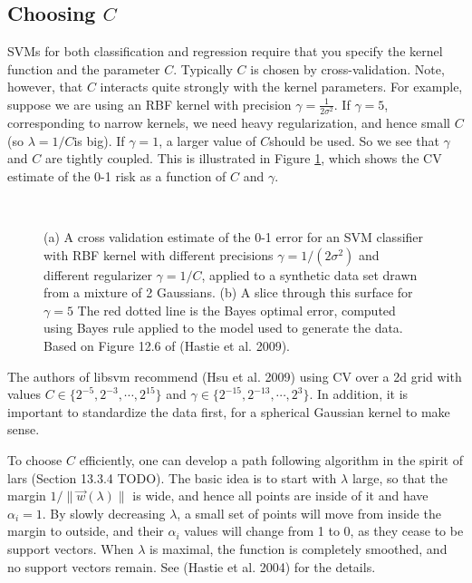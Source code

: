 \subsection{Choosing $C$}
\label{sec:SVM-Choosing-C}
SVMs for both classification and regression require that you specify the kernel function and the parameter $C$. Typically $C$ is chosen by cross-validation. Note, however, that $C$ interacts quite strongly with the kernel parameters. For example, suppose we are using an RBF kernel with precision $\gamma=\frac{1}{2\sigma^2}$. If $\gamma=5$, corresponding to narrow kernels, we need heavy regularization, and hence small $C$(so $\lambda=1/C$is big). If $\gamma=1$, a larger value of $C$should be used. So we see that $\gamma$ and $C$ are tightly coupled. This is illustrated in Figure \ref{fig:choosing-C}, which shows the CV estimate of the 0-1 risk as a function of $C$ and $\gamma$.

\begin{figure}[hbtp]
\centering
{} \\
\caption{(a) A cross validation estimate of the 0-1 error for an SVM classifier with RBF kernel with different precisions $\gamma=1/(2\sigma^2)$ and different regularizer $\gamma=1/C$, applied to a synthetic data set drawn from a mixture of 2 Gaussians. (b) A slice through this surface for $\gamma=5$ The red dotted line is the Bayes optimal error, computed using Bayes rule applied to the model used to generate the data. Based on Figure 12.6 of (Hastie et al. 2009). }
\label{fig:choosing-C} 
\end{figure}

The authors of libsvm recommend (Hsu et al. 2009) using CV over a 2d grid with values $C \in \{2^{-5},2^{-3},\cdots,2^{15}\}$ and $\gamma \in \{2^{-15},2^{-13},\cdots,2^3\}$. In addition, it is important to standardize the data first, for a spherical Gaussian kernel to make sense.

To choose $C$ efficiently, one can develop a path following algorithm in the spirit of lars (Section 13.3.4 TODO). The basic idea is to start with $\lambda$ large, so that the margin $1/\lVert\vec{w}(\lambda)\rVert$ is wide, and hence all points are inside of it and have $\alpha_i =1$. By slowly decreasing $\lambda$, a small set of points will move from inside the margin to outside, and their $\alpha_i$ values will change from 1 to 0, as they cease to be support vectors. When $\lambda$ is maximal, the function is completely smoothed, and no support vectors remain. See (Hastie et al. 2004) for the details.


